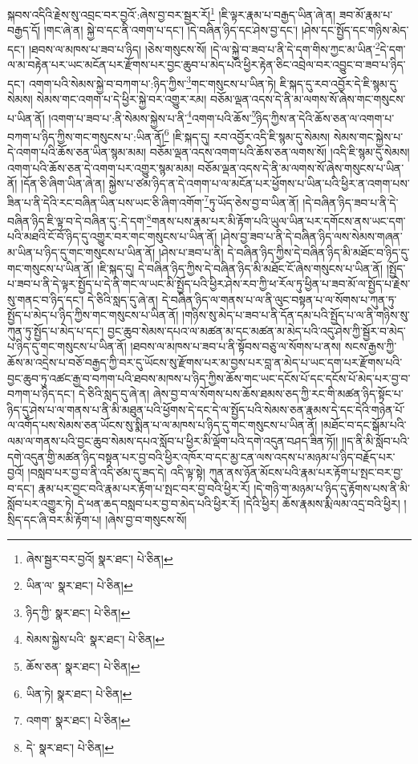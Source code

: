 སྐབས་འདིའི་རྗེས་སུ་འབྲང་བར་བྱའོ་:ཞེས་བྱ་བར་སྦྱར་རོ།\footnote{ཞེས་སྦྱར་བར་བྱའོ།  སྣར་ཐང་།  པེ་ཅིན། } །ཇི་ལྟར་རྣམ་པ་བརྒྱད་ཡིན་ཞེ་ན། ཟབ་མོ་རྣམ་པ་བརྒྱད་དོ། །གང་ཞེ་ན། སྐྱེ་བ་དང་ནི་འགག་པ་དང་། །དེ་བཞིན་ཉིད་དང་ཤེས་བྱ་དང་། །ཤེས་དང་སྤྱོད་དང་གཉིས་མེད་དང་། །ཐབས་ལ་མཁས་པ་ཟབ་པ་ཉིད། །ཅེས་གསུངས་སོ། །དེ་ལ་སྐྱེ་བ་ཟབ་པ་ནི་དེ་དག་གིས་ཀྱང་མ་ཡིན་\footnote{ཡིན་ལ་  སྣར་ཐང་།  པེ་ཅིན། }དེ་དག་ལ་མ་བརྟེན་པར་ཡང་མངོན་པར་རྫོགས་པར་བྱང་ཆུབ་པ་མེད་པའི་ཕྱིར་རྟེན་ཅིང་འབྲེལ་བར་འབྱུང་བ་ཟབ་པ་ཉིད་དང་། འགག་པའི་སེམས་སྐྱེ་བ་བཀག་པ་:ཉིད་ཀྱིས་\footnote{ཉིད་ཀྱི་  སྣར་ཐང་།  པེ་ཅིན། }གང་གསུངས་པ་ཡིན་ཏེ། ཇི་སྐད་དུ་རབ་འབྱོར་དེ་ཇི་སྙམ་དུ་སེམས། སེམས་གང་འགག་པ་དེ་ཕྱིར་སྐྱེ་བར་འགྱུར་རམ། བཅོམ་ལྡན་འདས་དེ་ནི་མ་ལགས་སོ་ཞེས་གང་གསུངས་པ་ཡིན་ནོ། །འགག་པ་ཟབ་པ་:ནི་སེམས་སྐྱེས་པ་ནི་\footnote{སེམས་སྐྱེས་པའི་  སྣར་ཐང་།  པེ་ཅིན། }འགག་པའི་ཆོས་\footnote{ཆོས་ཅན་  སྣར་ཐང་།  པེ་ཅིན། }ཉིད་ཀྱིས་ན་དེའི་ཆོས་ཅན་ལ་འགག་པ་བཀག་པ་ཉིད་ཀྱིས་གང་གསུངས་པ་:ཡིན་ནོ།\footnote{ཡིན་ཏེ།  སྣར་ཐང་།  པེ་ཅིན། } །ཇི་སྐད་དུ། རབ་འབྱོར་འདི་ཇི་སྙམ་དུ་སེམས། སེམས་གང་སྐྱེས་པ་དེ་འགག་པའི་ཆོས་ཅན་ཡིན་སྙམ་མམ། བཅོམ་ལྡན་འདས་འགག་པའི་ཆོས་ཅན་ལགས་སོ། །འདི་ཇི་སྙམ་དུ་སེམས། འགག་པའི་ཆོས་ཅན་དེ་འགག་པར་འགྱུར་སྙམ་མམ། བཅོམ་ལྡན་འདས་དེ་ནི་མ་ལགས་སོ་ཞེས་གསུངས་པ་ཡིན་ནོ། །དོན་ཅི་ཞིག་ཡིན་ཞེ་ན། སྐྱེས་པ་ཙམ་ཉིད་ན་དེ་འགག་པ་ལ་མངོན་པར་ཕྱོགས་པ་ཡིན་པའི་ཕྱིར་ན་འགག་པས་ཟིན་པ་ནི་དེའི་རང་བཞིན་ཡིན་པས་ཡང་ཅི་ཞིག་འགོག་\footnote{འགག་  སྣར་ཐང་།  པེ་ཅིན། }ཏུ་ཡོད་ཅེས་བྱ་བ་ཡིན་ནོ། །དེ་བཞིན་ཉིད་ཟབ་པ་ནི་དེ་བཞིན་ཉིད་ཇི་ལྟ་བ་དེ་བཞིན་དུ་:དེ་དག་\footnote{དེ་  སྣར་ཐང་།  པེ་ཅིན། }གནས་པས་རྣམ་པར་མི་རྟོག་པའི་ཡུལ་ཡིན་པར་དགོངས་ནས་ཡང་དག་པའི་མཐའི་ངོ་བོ་ཉིད་དུ་འགྱུར་བར་གང་གསུངས་པ་ཡིན་ནོ། །ཤེས་བྱ་ཟབ་པ་ནི་དེ་བཞིན་ཉིད་ལས་སེམས་གཞན་མ་ཡིན་པ་ཉིད་དུ་གང་གསུངས་པ་ཡིན་ནོ། །ཤེས་པ་ཟབ་པ་ནི། དེ་བཞིན་ཉིད་ཀྱིས་དེ་བཞིན་ཉིད་མི་མཐོང་བ་ཉིད་དུ་གང་གསུངས་པ་ཡིན་ནོ། །ཇི་སྐད་དུ། དེ་བཞིན་ཉིད་ཀྱིས་དེ་བཞིན་ཉིད་མི་མཐོང་ངོ་ཞེས་གསུངས་པ་ཡིན་ནོ། །སྤྱོད་པ་ཟབ་པ་ནི་དེ་ལྟར་སྤྱོད་པ་དེ་ནི་གང་ལ་ཡང་མི་སྤྱོད་པའི་ཕྱིར་ཤེས་རབ་ཀྱི་ཕ་རོལ་ཏུ་ཕྱིན་པ་ཟབ་མོ་ལ་སྤྱོད་པ་རྗེས་སུ་གནང་བ་ཉིད་དང་། དེ་ཅིའི་སླད་དུ་ཞེ་ན། དེ་བཞིན་ཉིད་ལ་གནས་པ་ལ་ནི་ལུང་བསྟན་པ་ལ་སོགས་པ་ཀུན་ཏུ་སྤྱོད་པ་མེད་པ་ཉིད་ཀྱིས་གང་གསུངས་པ་ཡིན་ནོ། །གཉིས་སུ་མེད་པ་ཟབ་པ་ནི་དོན་དམ་པའི་སྤྱོད་པ་ལ་ནི་གཉིས་སུ་ཀུན་ཏུ་སྤྱོད་པ་མེད་པ་དང་། བྱང་ཆུབ་སེམས་དཔའ་ལ་མཚན་མ་དང་མཚན་མ་མེད་པའི་འདུ་ཤེས་ཀྱི་སྦྱོར་བ་མེད་པ་ཉིད་དུ་གང་གསུངས་པ་ཡིན་ནོ། །ཐབས་ལ་མཁས་པ་ཟབ་པ་ནི་སྟོབས་བཅུ་ལ་སོགས་པ་ནས། སངས་རྒྱས་ཀྱི་ཆོས་མ་འདྲེས་པ་བཅོ་བརྒྱད་ཀྱི་བར་དུ་ཡོངས་སུ་རྫོགས་པར་མ་བྱས་པར་བླ་ན་མེད་པ་ཡང་དག་པར་རྫོགས་པའི་བྱང་ཆུབ་ཏུ་འཚང་རྒྱ་བ་བཀག་པའི་ཐབས་མཁས་པ་ཉིད་ཀྱིས་ཆོས་གང་ཡང་དངོས་པོ་དང་དངོས་པོ་མེད་པར་བྱ་བ་བཀག་པ་ཉིད་དང་། དེ་ཅིའི་སླད་དུ་ཞེ་ན། ཞེས་བྱ་བ་ལ་སོགས་པས་ཆོས་ཐམས་ཅད་ཀྱི་རང་གི་མཚན་ཉིད་སྟོང་པ་ཉིད་དུ་ཤེས་པ་ལ་གནས་པ་ནི་མི་མཐུན་པའི་ཕྱོགས་དེ་དང་དེ་ལ་སྤྱོད་པའི་སེམས་ཅན་རྣམས་དེ་དང་དེའི་གཉེན་པོ་ལ་འགོད་པས་སེམས་ཅན་ཡོངས་སུ་སྨིན་པ་ལ་མཁས་པ་ཉིད་དུ་གང་གསུངས་པ་ཡིན་ནོ། །མཐོང་བ་དང་སྒོམ་པའི་ལམ་ལ་གནས་པའི་བྱང་ཆུབ་སེམས་དཔའ་སློབ་པ་ཕྱིར་མི་ལྡོག་པའི་དགེ་འདུན་བཤད་ཟིན་ཏོ།། །།ད་ནི་མི་སློབ་པའི་དགེ་འདུན་གྱི་མཚན་ཉིད་བསྟན་པར་བྱ་བའི་ཕྱིར་འཁོར་བ་དང་མྱ་ངན་ལས་འདས་པ་མཉམ་པ་ཉིད་བརྗོད་པར་བྱའོ། །བསླབ་པར་བྱ་བ་ནི་འདི་ཙམ་དུ་ཟད་དེ། འདི་ལྟ་སྟེ། ཀུན་ནས་ཉོན་མོངས་པའི་རྣམ་པར་རྟོག་པ་སྤང་བར་བྱ་བ་དང་། རྣམ་པར་བྱང་བའི་རྣམ་པར་རྟོག་པ་སྤང་བར་བྱ་བའི་ཕྱིར་རོ། །དེ་གཉི་ག་མཉམ་པ་ཉིད་དུ་རྟོགས་པས་ནི་མི་སློབ་པར་འགྱུར་ཏེ། དེ་ཕན་ཆད་བསླབ་པར་བྱ་བ་མེད་པའི་ཕྱིར་རོ། །དེའི་ཕྱིར། ཆོས་རྣམས་རྨི་ལམ་འདྲ་བའི་ཕྱིར། །སྲིད་དང་ཞི་བར་མི་རྟོག་པ། །ཞེས་བྱ་བ་གསུངས་སོ། 